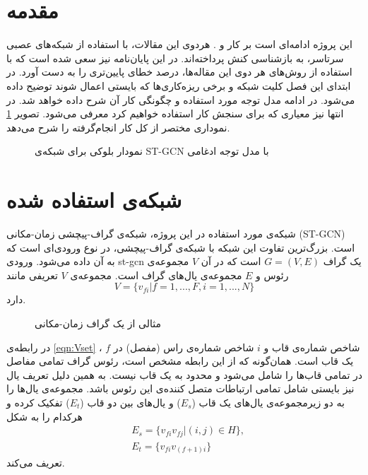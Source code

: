 
%
%

\section{مقدمه}
این پروژه ادامه‌ای است بر کار \cite{st-gcn} و \cite{attention_pooling_main}. هردوی این مقالات، با استفاده از شبکه‌های عصبی سرتاسر، به بازشناسی کنش پرداخته‌اند. در این پایان‌نامه نیز سعی شده‌ است که با استفاده از روش‌های هر دوی این مقاله‌ها، درصد خطای پایین‌تری را به دست آورد. در ابتدای این فصل کلیت شبکه و برخی ریزه‌کاری‌ها که بایستی اعمال شوند توضیح داده می‌شود. در ادامه مدل توجه مورد استفاده و چگونگی کار آن شرح داده خواهد شد. در انتها نیز معیاری که برای سنجش کار استفاده خواهیم کرد معرفی می‌شود. تصویر \ref{fig:block_diagram} نموداری مختصر از کل کار انجام‌گرفته را شرح می‌دهد. 
\begin{figure}
\label{fig:block_diagram}
\caption[نمودار بلوکی برای شبکه‌ی ST-GCN با مدل توجه ادغامی]{نمودار بلوکی برای شبکه‌ی ST-GCN با مدل توجه ادغامی}
\end{figure}

\section{شبکه‌ی استفاده شده}
شبکه‌ی مورد استفاده در این پروژه، شبکه‌ی گراف‌-پیچشی زمان‌-مکانی (ST-GCN) است. بزرگ‌ترین تفاوت این شبکه با شبکه‌ی گراف‌-پیچشی، در نوع ورودی‌ای است که به آن داده می‌شود. ورودی st-gcn یک گراف $G=(V, E)$ است که در آن $V$ مجموعه‌ی رئوس و $E$ مجموعه‌ی یال‌های گراف است. مجموعه‌ی $V$  تعریفی مانند
\begin{equation}\label{eqn:Vset}
	V = \{v_{fi}|f = 1, ..., F , i = 1, ..., N\}
\end{equation}
 دارد. \cite{st-gcn}

\begin{figure}
\caption[مثالی از یک گراف زمان-مکانی]{{\footnotesize مثالی از یک گراف زمان-مکانی}}
\label{fig:stgExample}
\end{figure}

در رابطه‌ی \ref{eqn:Vset} ، $f$  شاخص شماره‌ی قاب و $i$ شاخص شماره‌ی راس (مفصل) در یک قاب است. همان‌گونه که از این رابطه مشخص است، رئوس گراف تمامی مفاصل در تمامی قاب‌ها را شامل می‌شود و محدود به یک قاب نیست. به همین دلیل تعریف یال نیز بایستی شامل تمامی ارتباطات متصل کننده‌ی این رئوس باشد. \cite{st-gcn} مجموعه‌ی یال‌ها را به دو زیرمجموعه‌ی یال‌های یک قاب ($E_s$) و یال‌های بین دو قاب ($E_t$) تفکیک کرده و هرکدام را به شکل 
\begin{equation}\label{eqn:ESTset}
\begin{split}
	&E_s = \{v_{fi}v_{fj}|(i, j)\in H\} , \\
	  &E_t = \{v_{fi}v_{(f+1)i}\}
\end{split}
\end{equation}
 تعریف ‌می‌کند.\cite{st-gcn}




